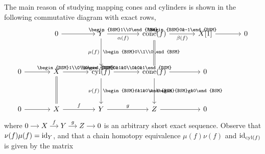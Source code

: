 The main reason of studying mapping cones and cylinders is shown in the following commutative diagram with exact rows,
\begin{equation*}
  \begin{tikzcd}[ampersand replacement=\&,column sep=large,row sep=huge]
    \& 0 \& Y \& \CONE(f) \& X[1] \& 0\\
    0 \& X \& \CYL(f) \& \CONE(f)\& 0\\
    0 \& X \& Y \& Z \& 0
    \arrow[from=1-2,]{1-3}[]{}
    \arrow[from=1-3,]{1-4}[]{\begin{BSM}1\\0\end{BSM}}[swap,]{\alpha(f)}
    \arrow[from=1-4,]{1-5}[]{\begin{BSM}0&-1\end{BSM}}[swap,]{\beta(f)}
    \arrow[from=1-5,]{1-6}[]{}
    \arrow[from=2-1,]{2-2}[]{}
    \arrow[from=2-2,]{2-3}[]{\begin{BSM}1\\0\\0\end{BSM}}
    \arrow[from=2-3,]{2-4}[]{\begin{BSM}0&1&0\\0&0&1\end{BSM}}
    \arrow[from=2-4,]{2-5}[]{}
    \arrow[from=3-1,]{3-2}[]{}
    \arrow[from=3-2,]{3-3}[]{f}
    \arrow[from=3-3,]{3-4}[]{g}
    \arrow[from=3-4,]{3-5}[]{}
    \arrow[from=1-3,]{2-3}[]{\begin{BSM}0\\1\\0\end{BSM}}[swap,]{\mu(f)}
    \arrow[from=1-4,equal,]{2-4}[]{}
    \arrow[from=2-2,equal,]{3-2}[]{}
    \arrow[from=2-3,]{3-3}[]{\begin{BSM}f&1&0\end{BSM}}[swap,]{\nu(f)}
    \arrow[from=2-4,]{3-4}[]{\begin{BSM}g&0\end{BSM}}[swap,]{\varphi}
  \end{tikzcd}
\end{equation*}
where
$\begin{tikzcd}[cramped, sep=small]
  0 & X & Y & Z & 0
  \arrow[from=1-1,]{1-2}[]{}
  \arrow[from=1-2,]{1-3}[]{f}
  \arrow[from=1-3,]{1-4}[]{g}
  \arrow[from=1-4,]{1-5}[]{}
\end{tikzcd}$
is an arbitrary short exact sequence. Observe that $\nu(f)\mu(f)=\textrm{id}_Y$, and that a chain homotopy equivalence $\mu(f)\nu(f)$ and $\textrm{id}_{\operatorname{cyl}(f)}$ is given by the matrix
